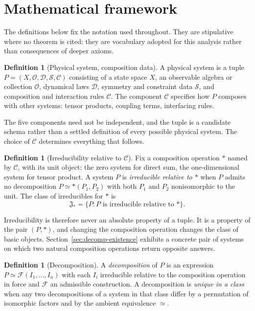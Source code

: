 \documentclass[11pt,letterpaper]{article}
\theoremstyle{definition}
\newtheorem{definition}[theorem]{Definition}
\theoremstyle{remark}
\begin{document}
\section{Mathematical framework}

The definitions below fix the notation used throughout. They are stipulative where no theorem is cited: they are vocabulary adopted for this analysis rather than consequences of deeper axioms.

\begin{definition}[Physical system, composition data]
A physical system is a tuple $P = (X, \mathcal{O}, \mathcal{D}, \mathcal{S}, \mathcal{C})$ consisting of a state space $X$, an observable algebra or collection $\mathcal{O}$, dynamical laws $\mathcal{D}$, symmetry and constraint data $\mathcal{S}$, and composition and interaction rules $\mathcal{C}$. The component $\mathcal{C}$ specifies how $P$ composes with other systems: tensor products, coupling terms, interfacing rules.
\end{definition}

The five components need not be independent, and the tuple is a candidate schema rather than a settled definition of every possible physical system. The choice of $\mathcal{C}$ determines everything that follows.

\begin{definition}[Irreducibility relative to $\mathcal{C}$]
Fix a composition operation $\ast$ named by $\mathcal{C}$, with its unit object: the zero system for direct sum, the one-dimensional system for tensor product. A system $P$ is \emph{irreducible relative to $\ast$} when $P$ admits no decomposition $P \simeq \ast(P_1, P_2)$ with both $P_1$ and $P_2$ nonisomorphic to the unit. The class of irreducibles for $\ast$ is
\[
\mathfrak{J}_{\ast} = \{ P : P \text{ is irreducible relative to } \ast \}.
\]
\end{definition}

Irreducibility is therefore never an absolute property of a tuple. It is a property of the pair $(P, \ast)$, and changing the composition operation changes the class of basic objects. Section~\ref{sec:decomp-existence} exhibits a concrete pair of systems on which two natural composition operations return opposite answers.

\begin{definition}[Decomposition]
A \emph{decomposition} of $P$ is an expression $P \simeq \mathcal{F}(I_1, \dots, I_n)$ with each $I_i$ irreducible relative to the composition operation in force and $\mathcal{F}$ an admissible construction. A decomposition is \emph{unique in a class} when any two decompositions of a system in that class differ by a permutation of isomorphic factors and by the ambient equivalence $\simeq$.
\end{definition}
\end{document}
